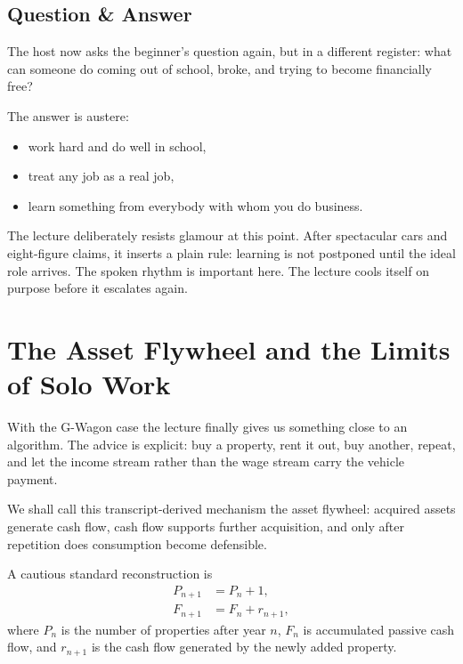 \subsection{Question \& Answer}

The host now asks the beginner's question again, but in a different register: what can someone do coming out of school, broke, and trying to become financially free?

The answer is austere:
\begin{itemize}
\item work hard and do well in school,
\item treat any job as a real job,
\item learn something from everybody with whom you do business.
\end{itemize}

The lecture deliberately resists glamour at this point. After spectacular cars and eight-figure claims, it inserts a plain rule: learning is not postponed until the ideal role arrives. The spoken rhythm is important here. The lecture cools itself on purpose before it escalates again.

\section{The Asset Flywheel and the Limits of Solo Work}

With the G-Wagon case the lecture finally gives us something close to an algorithm. The advice is explicit: buy a property, rent it out, buy another, repeat, and let the income stream rather than the wage stream carry the vehicle payment.

\begin{definition}
We shall call this transcript-derived mechanism the asset flywheel: acquired assets generate cash flow, cash flow supports further acquisition, and only after repetition does consumption become defensible.
\end{definition}

A cautious standard reconstruction is
\begin{align}
P_{n+1} &= P_n + 1,\\
F_{n+1} &= F_n + r_{n+1},
\end{align}
where \(P_n\) is the number of properties after year \(n\), \(F_n\) is accumulated passive cash flow, and \(r_{n+1}\) is the cash flow generated by the newly added property.

